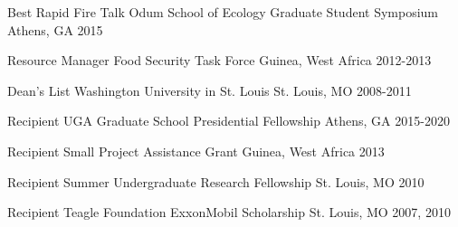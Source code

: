 



\begin{cvhonors}
  \cvhonor
    {Best Rapid Fire Talk} %
    {Odum School of Ecology Graduate Student Symposium} %
    {Athens, GA} %
    {2015} %

  \cvhonor
    {Resource Manager} %
    {Food Security Task Force} %
    {Guinea, West Africa} %
    {2012-2013} %

  \cvhonor
    {Dean's List} %
    {Washington University in St. Louis} %
    {St. Louis, MO} %
    {2008-2011} %

\end{cvhonors}

\medskip

\begin{cvhonors}
  \cvhonor
    {Recipient} %
    {UGA Graduate School Presidential Fellowship} %
    {Athens, GA} %
    {2015-2020} %

  \cvhonor
    {Recipient} %
    {Small Project Assistance Grant} %
    {Guinea, West Africa} %
    {2013} %
    
  \cvhonor
    {Recipient} %
    {Summer Undergraduate Research Fellowship} %
    {St. Louis, MO} %
    {2010} %

  \cvhonor
    {Recipient} %
    {Teagle Foundation ExxonMobil Scholarship} %
    {St. Louis, MO} %
    {2007, 2010} %

\end{cvhonors}
    



